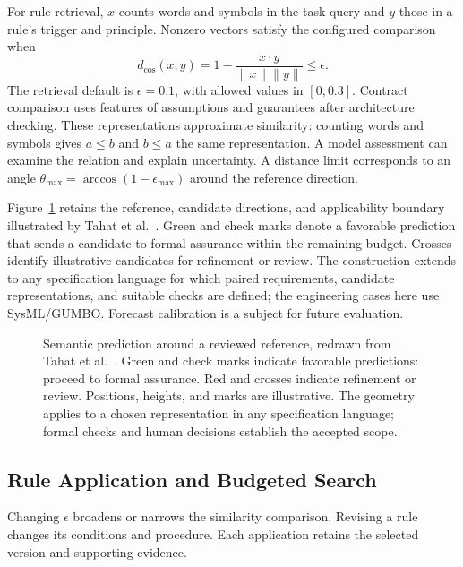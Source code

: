 For rule retrieval, $x$ counts words and symbols in the task query and $y$ those in a rule's trigger and principle. Nonzero vectors satisfy the configured comparison when
\begin{equation}
d_{\cos}(x,y)=1-\frac{x\cdot y}{\|x\|\|y\|}\leq\epsilon.
\label{eq:retrieval-distance}
\end{equation}
The retrieval default is $\epsilon=0.1$, with allowed values in $[0,0.3]$. Contract comparison uses features of assumptions and guarantees after architecture checking. These representations approximate similarity: counting words and symbols gives $a\leq b$ and $b\leq a$ the same representation. A model assessment can examine the relation and explain uncertainty. A distance limit corresponds to an angle $\theta_{\max}=\arccos(1-\epsilon_{\max})$ around the reference direction.

Figure~\ref{fig:semantic-cone} retains the reference, candidate directions, and applicability boundary illustrated by Tahat et al.~\cite[slide~12]{tahat2026dascslides}. Green and check marks denote a favorable prediction that sends a candidate to formal assurance within the remaining budget. Crosses identify illustrative candidates for refinement or review. The construction extends to any specification language for which paired requirements, candidate representations, and suitable checks are defined; the engineering cases here use SysML/GUMBO. Forecast calibration is a subject for future evaluation.

\begin{figure}[!htbp]
\centering

\caption{Semantic prediction around a reviewed reference, redrawn from Tahat et al.~\cite[slide~12]{tahat2026dascslides}. Green and check marks indicate favorable predictions: proceed to formal assurance. Red and crosses indicate refinement or review. Positions, heights, and marks are illustrative. The geometry applies to a chosen representation in any specification language; formal checks and human decisions establish the accepted scope.}
\label{fig:semantic-cone}
\end{figure}

\subsection{Rule Application and Budgeted Search}
Changing $\epsilon$ broadens or narrows the similarity comparison. Revising a rule changes its conditions and procedure. Each application retains the selected version and supporting evidence.

